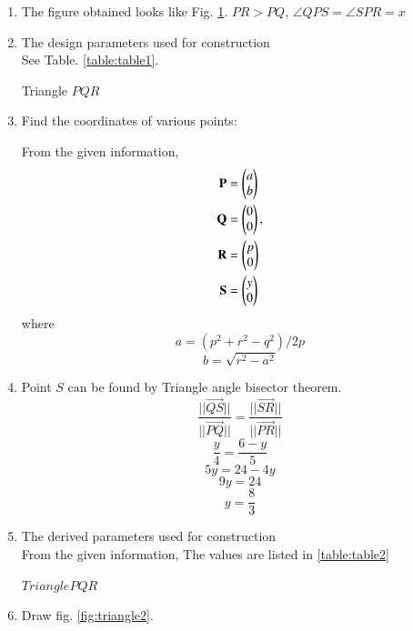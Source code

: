 \renewcommand{\theequation}{\theenumi}
\begin{enumerate}[label=\thesection.\arabic*.,ref=\thesection.\theenumi]

\begin{figure}[!ht]
\centering
\resizebox{\columnwidth}{!}{}
\caption{Triangle by Latex-Tikz}
\label{fig:triangle1}	
\end{figure}

\item The figure obtained looks like Fig. \ref{fig:triangle1}.
$PR > PQ$, $\angle{QPS}=\angle{SPR}=x$

\item The design parameters used for construction \\

\solution See Table. \ref{table:table1}.
\begin{table}[ht!]
\centering

\caption{Triangle $PQR$}
\label{table:table1}	
\end{table} 


\item Find the coordinates of various points: 

\solution From the given information, 
\begin{align}
\mathbf{P} &= \begin{pmatrix}a\\b\end{pmatrix}
\label{eq:constr_a} 
\\
 \mathbf{Q} &= \begin{pmatrix}0\\0\end{pmatrix}, 
\label{eq:constr_b}
\\
\mathbf{R} &= \begin{pmatrix}p\\0\end{pmatrix}
\label{eq:constr_c}
\\
\mathbf{S} &= \begin{pmatrix}y\\0\end{pmatrix}
\label{eq:constr_d}
\end{align}
where
$$ a =(p^2+r^2-q^2)/2p $$
$$ b =\sqrt{r^2-a^2} $$

\item Point $S$ can be found by Triangle angle bisector theorem.
$$\frac{||\vec{QS}||}{||\vec{PQ}||} = \frac{||\vec{SR}||}{||\vec{PR}||}$$
$$\frac{y}{4} = \frac{6-y}{5}$$
$$5y = 24 - 4y$$
$$9y = 24$$
$$y = \frac{8}{3}$$

\item The derived parameters used for construction \\

\solution From the given information, 
The values are listed in \ref{table:table2}\\
\begin{table}[ht!]
\centering

\caption{$Triangle PQR$}
\label{table:table2}	
\end{table} 
\item Draw fig. \ref{fig:triangle2}.


\end{enumerate}
